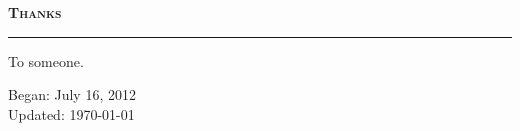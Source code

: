 
\newpage\noindent
\begin{spacing}{0}
	\begin{flushright}
		\textsc{\textbf{\Huge Thanks}}
		\rule{\textwidth}{.5pt}
	\end{flushright}	
\end{spacing}
\vspace{26pt}
\thispagestyle{empty}
\noindent
To someone.\\

\vfill
\begin{flushright}
Began: July 16, 2012\\
Updated: \today\\
\end{flushright}